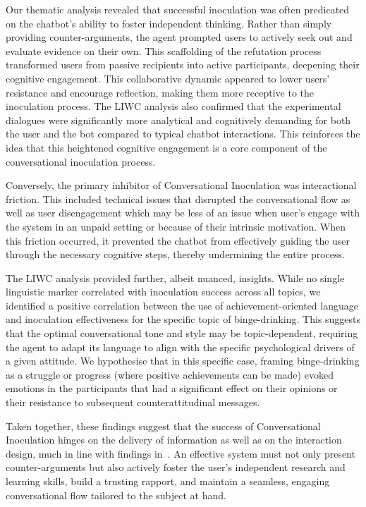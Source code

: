 \documentclass[sigconf]{acmart}
\begin{document}
Our thematic analysis revealed that successful inoculation was often predicated on the chatbot's ability to foster independent thinking.
Rather than simply providing counter-arguments, the agent prompted users to actively seek out and evaluate evidence on their own.
This scaffolding of the refutation process transformed users from passive recipients into active participants, deepening their cognitive engagement.
This collaborative dynamic appeared to lower users' resistance and encourage reflection, making them more receptive to the inoculation process.
The LIWC analysis also confirmed that the experimental dialogues were significantly more analytical and cognitively demanding for both the user and the bot compared to typical chatbot interactions. This reinforces the idea that this heightened cognitive engagement is a core component of the conversational inoculation process. 

Conversely, the primary inhibitor of Conversational Inoculation was interactional friction.
This included technical issues that disrupted the conversational flow as well as user disengagement which may be less of an issue when user's engage with the system in an unpaid setting or because of their intrinsic motivation.
When this friction occurred, it prevented the chatbot from effectively guiding the user through the necessary cognitive steps, thereby undermining the entire process. 

The LIWC analysis provided further, albeit nuanced, insights.
While no single linguistic marker correlated with inoculation success across all topics, we identified a positive correlation between the use of achievement-oriented language and inoculation effectiveness for the specific topic of binge-drinking.
This suggests that the optimal conversational tone and style may be topic-dependent, requiring the agent to adapt its language to align with the specific psychological drivers of a given attitude.
We hypothesise that in this specific case, framing binge-drinking as a struggle or progress (where positive achievements can be made) evoked emotions in the participants that had a significant effect on their opinions or their resistance to subsequent counterattitudinal messages.  

Taken together, these findings suggest that the success of Conversational Inoculation hinges on the delivery of information as well as on the interaction design, much in line with findings in~\cite{Gong2025276}.
An effective system must not only present counter-arguments but also actively foster the user's independent research and learning skills, build a trusting rapport, and maintain a seamless, engaging conversational flow tailored to the subject at hand.
\end{document}
